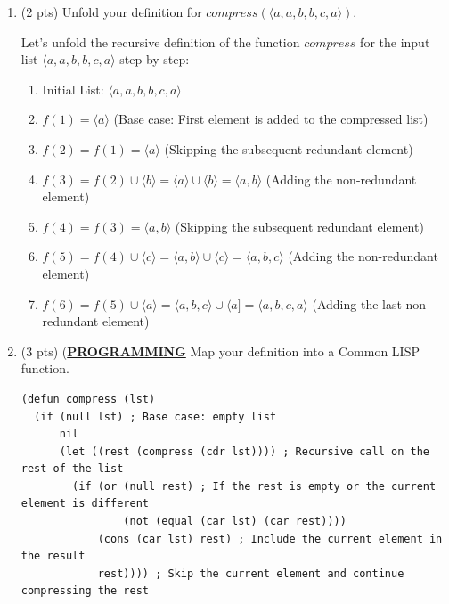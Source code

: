 \documentclass[12pt]{article}
\begin{document}
\begin{spacing}{1.5}
\begin{enumerate}
\begin{enumerate}
\begin{itemize}
		      	      	\item If $a_n \neq a_{n-1}$, then $f(n) = f(n-1) \cup [a_n]$, adding the current element to the compressed list.
		      	      \end{itemize}
		      \end{enumerate}
		      
		\item (2 pts) Unfold your definition for $compress(\langle a, a, b, b, c, a \rangle)$.
		      
		      Let's unfold the recursive definition of the function $compress$ for the input list $\langle a, a, b, b, c, a \rangle$ step by step:
		      
		      \begin{enumerate}
		      	\item Initial List: $\langle a, a, b, b, c, a \rangle$
		      	      
		      	\item $f(1) = \langle a \rangle$ (Base case: First element is added to the compressed list)
		      	      
		      	\item $f(2) = f(1) = \langle a \rangle$ (Skipping the subsequent redundant element)
		      	      
		      	\item $f(3) = f(2) \cup \langle b \rangle = \langle a \rangle \cup \langle b \rangle = \langle a, b \rangle$ (Adding the non-redundant element)
		      	      
		      	\item $f(4) = f(3) = \langle a, b \rangle$ (Skipping the subsequent redundant element)
		      	      
		      	\item $f(5) = f(4) \cup \langle c \rangle = \langle a, b \rangle \cup \langle c \rangle = \langle a, b, c \rangle$ (Adding the non-redundant element)
		      	      
		      	\item $f(6) = f(5) \cup \langle a \rangle = \langle a, b, c \rangle \cup \langle a] = \langle a, b, c, a \rangle$ (Adding the last non-redundant element)
		      \end{enumerate}
		      
		\item (3 pts) (\uline{\textbf{PROGRAMMING}} Map your definition into a Common LISP function.\\
		      
		      \begin{lstlisting}
(defun compress (lst)
  (if (null lst) ; Base case: empty list
      nil
      (let ((rest (compress (cdr lst)))) ; Recursive call on the rest of the list
        (if (or (null rest) ; If the rest is empty or the current element is different
                (not (equal (car lst) (car rest))))
            (cons (car lst) rest) ; Include the current element in the result
            rest)))) ; Skip the current element and continue compressing the rest
		      \end{lstlisting}
		              
	\end{enumerate}
\end{spacing}
\end{document}
